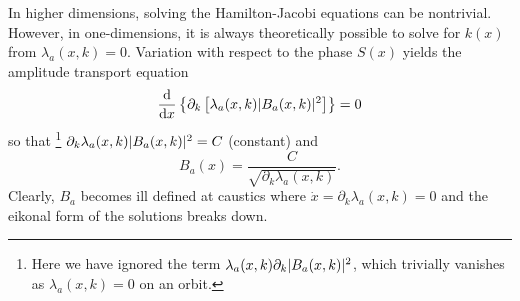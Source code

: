 In higher dimensions, solving the Hamilton-Jacobi equations can be nontrivial.
However, in one-dimensions, it is always theoretically possible to solve for $k(x)$ from $\lambda_{a}(x, k) = 0$.
Variation with respect to the phase $S(x)$ yields the amplitude transport equation
%
\begin{equation}
  \frac{\mathrm{d}}{\mathrm{d}{x}}\left\{\partial_{k}\left[\lambda_{a}(x, k)\lvert B_{a}(x, k)\rvert^{2}\right]\right\} = 0
\end{equation}
%
so that%
\footnote{Here we have ignored the term $\lambda_{a}(x, k)\partial_{k}\lvert B_{a}(x,k)\rvert^{2}$, which trivially vanishes as $\lambda_{a}(x, k) = 0$ on an orbit.}
$\partial_{k}\lambda_{a}(x, k)\lvert B_{a}(x, k)\rvert^{2} = C$ (constant) and
%
\begin{equation}
  B_{a}(x) = \frac{C}{\sqrt{\partial_{k}\lambda_{a}(x, k)}}.
\end{equation}
%
Clearly, $B_{a}$ becomes ill defined at caustics where $\dot{x} = \partial_{k}\lambda_{a}(x, k) = 0$ and the eikonal form of the solutions breaks down.


